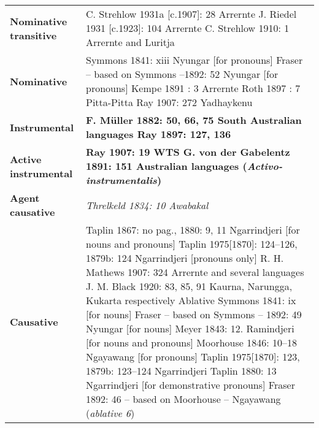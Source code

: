 \begin{table}
	\small
	\begin{tabular}{p{2cm}p{9cm}}
		\lsptoprule
		\textbf{Nominative transitive}	& C. Strehlow 1931a [c.1907]: 28 Arrernte 
		\newline J. Riedel 1931 [c.1923]: 104 Arrernte 
		\newline C. Strehlow 1910: 1 Arrernte and Luritja \\
		\textbf{Nominative}	& Symmons 1841: xiii Nyungar [for pronouns]
		\newline Fraser – based on Symmons –1892: 52 Nyungar [for pronouns]
		\newline Kempe 1891 : 3 Arrernte
		\newline Roth 1897 : 7 Pitta-Pitta
		\newline Ray 1907: 272 Yadhaykenu \\
		\textbf{Instrumental} &	\textbf{F. Müller 1882: 50, 66, 75 South Australian languages
			\newline Ray 1897: 127, 136 \stockcaps{WTS}} \\
		\textbf{Active instrumental} &	\textbf{Ray 1907: 19 WTS
			\newline G. von der Gabelentz 1891: 151 Australian languages (\textit{Activo-instrumentalis})} \\
		\textbf{Agent causative} &	\textit{Threlkeld 1834: 10 Awabakal} \\
		\textbf{Causative} &	Taplin 1867: no pag., 1880: 9, 11 Ngarrindjeri [for nouns and pronouns]
		\newline Taplin 1975[1870]: 124--126, 1879b: 124 Ngarrindjeri [pronouns only]
		\newline R. H. Mathews 1907: 324 Arrernte and several languages
		\newline J. M. Black 1920: 83, 85, 91 Kaurna, Narungga, Kukarta respectively
		\newline Ablative	Symmons 1841: ix [for nouns]
		\newline Fraser – based on Symmons – 1892: 49 Nyungar [for nouns]
		\newline Meyer 1843: 12. Ramindjeri [for nouns and pronouns]
		\newline Moorhouse 1846: 10--18 Ngayawang [for pronouns]
		\newline Taplin 1975[1870]: 123, 1879b: 123--124 Ngarrindjeri 
		\newline Taplin 1880: 13 Ngarrindjeri [for demonstrative pronouns]
		\newline Fraser 1892: 46 – based on Moorhouse – Ngayawang (\textit{ablative 6})

\end{tabular}
\end{table}
